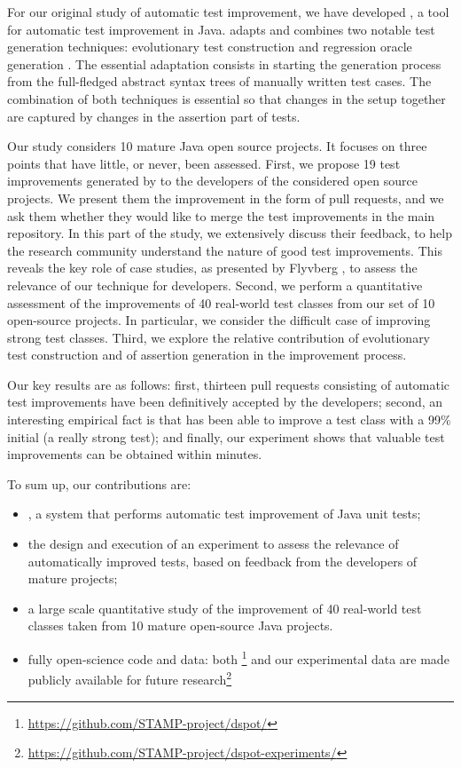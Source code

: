 For our original study of automatic test improvement, we have developed \dspot, a tool for automatic test improvement in Java.  \dspot  adapts and combines two notable test generation techniques: evolutionary test construction \cite{tonella} and regression oracle generation \cite{Xie2006}. The essential adaptation consists in starting the generation process from the full-fledged abstract syntax trees of manually written test cases. The combination of both techniques is essential so that changes in the setup together are captured by changes in the assertion part of tests. 

Our study considers 10 mature Java open source projects. It focuses  on three points that have little, or never, been assessed. First, we propose 19 test improvements  generated by \dspot to the developers of the considered open source projects. We present them  the improvement in the form of pull requests, and we ask them whether they would like to merge the test improvements in the main repository. In this part of the study, we extensively discuss their feedback, to help the research community understand the nature of good test improvements. This reveals the key role of case studies, as presented by Flyvberg \cite{flyvbjerg2006}, to assess the relevance of our technique for developers.
Second, we perform a quantitative assessment of the improvements of 40 real-world test classes from our set of 10 open-source projects. In particular, we consider the difficult case of improving strong test classes.
Third, we explore the relative contribution of evolutionary test construction and of assertion generation in the improvement process.

Our key results are as follows: first, thirteen \gh pull requests consisting of automatic test improvements have been definitively accepted by the developers; second, an interesting empirical fact is that \dspot has been able to improve a test class with a 99\% initial \ms (\ie a really strong test); and finally, our experiment shows that valuable test improvements can be obtained within minutes.

To sum up, our contributions are:
\begin{itemize}
	\item  \dspot, a system that performs automatic test improvement of Java unit tests; 
	
	\item the design and execution of an experiment to assess the relevance of automatically improved tests, based on feedback from the developers of mature projects;
	
	\item a large scale quantitative study of the improvement of 40 real-world test classes taken from 10 mature open-source Java projects.
	
	\item fully open-science code and data: both \dspot\footnote{\url{https://github.com/STAMP-project/dspot/}} and our experimental data are made publicly available for future research\footnote{\url{https://github.com/STAMP-project/dspot-experiments/}}
	
\end{itemize}

